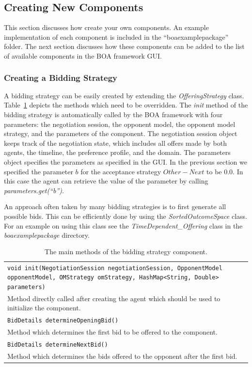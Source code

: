 \documentclass[]{article}
\begin{document}
\subsection{Creating New Components}
This section discusses how create your own components. An example implementation of each component is included in the ``boaexamplepackage'' folder. The next section discusses how these components can be added to the list of available components in the BOA framework GUI.

\subsubsection{Creating a Bidding Strategy}
A bidding strategy can be easily created by extending the \textit{OfferingStrategy} class. Table~\ref{tab:BOAbs} depicts the methods which need to be overridden. The \textit{init} method of the bidding strategy is automatically called by the BOA framework with four parameters: the negotiation session, the opponent model, the opponent model strategy, and the parameters of the component. The negotiation session object keeps track of the negotiation state, which includes all offers made by both agents, the timeline, the preference profile, and the domain. The parameters object specifies the parameters as specified in the GUI. In the previous section we specified the parameter $b$ for the acceptance strategy $Other - Next$ to be 0.0. In this case the agent can retrieve the value of the parameter by calling \textit{parameters.get(``b'')}.

An approach often taken by many bidding strategies is to first generate all possible bids. This can be efficiently done by using the \textit{SortedOutcomeSpace} class. For an example on using this class see the \textit{TimeDependent\_Offering} class in the \textit{boaexamplepackage} directory.

\begin{table}[h]
\begin{tabular}{m{}}
\hline
\texttt{void init(NegotiationSession negotiationSession, OpponentModel opponentModel, 
						OMStrategy omStrategy, HashMap<String, Double> parameters)}\\
Method directly called after creating the agent which should be used to initialize the component.\\
\hline
\texttt{BidDetails determineOpeningBid()}\\
Method which determines the first bid to be offered to the component.\\
\hline
\texttt{BidDetails determineNextBid()}\\
Method which determines the bids offered to the opponent after the first bid.\\
\hline
\end{tabular}
\caption{The main methods of the bidding strategy component.}
\label{tab:BOAbs}
\end{table}
\end{document}
